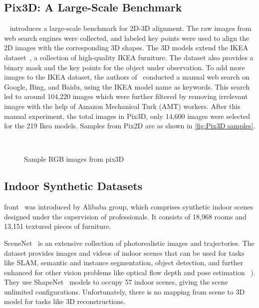 \subsection{Pix3D: A Large-Scale Benchmark}\label{sec:pix3d}
~\cite{Sun2018} introduces a large-scale benchmark for 2D-3D alignment.
The raw images from web search engines were collected, and labeled key points were used to align the 2D images with the corresponding 3D shapes.
The 3D models extend the IKEA dataset~\cite{Lim2013}, a collection of high-quality IKEA furniture.
The dataset also provides a binary mask and the key points for the object under observation.
To add more images to the IKEA dataset, the authors of~\cite{Sun2018} conducted a manual web search on Google, Bing, and Baidu, using the IKEA model name as keywords.
This search led to around 104,220 images which were further filtered by removing irrelevant images with the help of Amazon Mechanical Turk (AMT) workers.
After this manual experiment, the total images in Pix3D, only 14,600 images were selected for the 219 Ikea models.
Samples from Pix2D are as shown in \autoref{fig:Pix3D samples}.

\begin{figure}[!ht]
    \centering
    \quad
    \\
    \quad
    \caption[Samples from Pix3D.]{Sample RGB images from pix3D}
    \label{fig:Pix3D samples}
\end{figure}

\subsection{Indoor Synthetic Datasets}\label{subsec:indoor-synthetic-datasets}
\gls{front}~\cite{Fu20203DFRONT3F} was introduced by Alibaba group, which comprises
synthetic indoor scenes designed under the supervision of professionals.
It consists of 18,968 rooms and 13,151 textured pieces of furniture.

SceneNet~\cite{McCormac2017} is an extensive collection of photorealistic images and trajectories.
The dataset provides images and videos of indoor scenes that can be used for tasks like SLAM,
semantic and instance segmentation, object detection, and further enhanced for other vision problems like optical flow depth and pose estimation ~\cite{McCormac2017}).
They use ShapeNet~\cite{shapenet2015} models to occupy 57 indoor scenes, giving the scene unlimited configurations.
Unfortunately, there is no mapping from scene to 3D model for tasks like 3D reconstructions.

